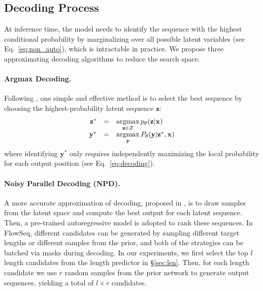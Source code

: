 \documentclass[11pt,a4paper]{article}
\newcommand{\xv}{\mathbf{x}}
\newcommand{\yv}{\mathbf{y}}
\newcommand{\zv}{\mathbf{z}}
\newcommand{\argmax}{\operatornamewithlimits{argmax}}
\begin{document}
\vspace{-2mm}
\subsection{Decoding Process}
At inference time, the model needs to identify the sequence with the highest conditional probability by marginalizing over all possible latent variables (see Eq.~\eqref{eq:non_auto}), which is intractable in practice.
We propose three approximating decoding algorithms to reduce the search space.
\vspace{-2mm}
\paragraph{Argmax Decoding.} 
Following \citet{gu2018non}, one simple and effective method is to select the best sequence by choosing the highest-probability latent sequence $\zv$:
\begin{displaymath}
\begin{array}{rcl}
\zv^* & = & \argmax\limits_{\zv \in \mathcal{Z}} p_{\theta}(\zv | \xv) \\
\yv^* & = & \argmax\limits_{\yv} P_{\theta} (\yv | \zv^*, \xv)
\end{array}
\vspace{-2mm}
\end{displaymath}
where identifying $\yv^*$ only requires independently maximizing the local probability for each output position (see Eq.~\ref{eq:decoding}).

\paragraph{Noisy Parallel Decoding (NPD).}
A more accurate approximation of decoding, proposed in \citet{gu2018non}, is to draw samples from the latent space and compute the best output for each latent sequence.
Then, a pre-trained autoregressive model is adopted to rank these sequences.
In FlowSeq, different candidates can be generated by sampling different target lengths or different samples from the prior, and both of the strategies can be batched via masks during decoding.
In our experiments, we first select the top $l$ length candidates from the length predictor in \S\ref{sec:len}.
Then, for each length candidate we use $r$ random samples from the prior network to generate output sequences, yielding a total of $l\times r$ candidates.
\end{document}

